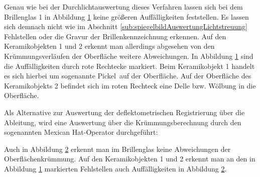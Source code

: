 {
	\begin{figure}[H]
		\centering
		
		\label{tikz:abbAbleitungRegistrierungSpiegel}
	\end{figure}
}

\noindent
Genau wie bei der Durchlichtauswertung dieses Verfahren lassen sich bei dem Brillenglas 1 in Abbildung \ref{tikz:abbAbleitungRegistrierungSpiegel} keine größeren Auffälligkeiten feststellen.
Es lassen sich demnach nicht wie im Abschnitt \ref{sub:spiegelbildAuswertungLichtstreuung} Fehlstellen oder die Gravur der Brillenkennzeichnung erkennen.
Auf den Keramikobjekten 1 und 2 erkennt man allerdings abgesehen von den Krümmungsverläufen der Oberfläche weitere Abweichungen.
In Abbildung \ref{tikz:abbAbleitungRegistrierungSpiegel} sind die Auffälligkeiten durch rote Rechtecke markiert.
Beim Keramikobjekt 1 handelt es sich hierbei um sogenannte  \glqq Pickel\grqq ~auf der Oberfläche.
Auf der Oberfläche des Keramikobjekts 2 befindet sich im roten Rechteck eine Delle bzw. Wölbung in die Oberfläche.

\p
Als Alternative zur Auswertung der deflektometrischen Registrierung über die Ableitung, wird eine Auswertung über die Krümmungsberechnung durch den sogenannten Mexican Hat-Operator durchgeführt: 

{
	\begin{figure}[H]
		\centering
		
		\label{tikz:abbMexicanHatRegistrierung}
	\end{figure}
}

\noindent
Auch in Abbildung \ref{tikz:abbMexicanHatRegistrierung} erkennt man im Brillenglas keine Abweichungen der Oberflächen\-krümmung.
Auf den Keramikobjekten 1 und 2 erkennt man an den in Abbildung \ref{tikz:abbAbleitungRegistrierungSpiegel} markierten Fehlstellen auch Auffälligkeiten in Abbildung \ref{tikz:abbMexicanHatRegistrierung}.

